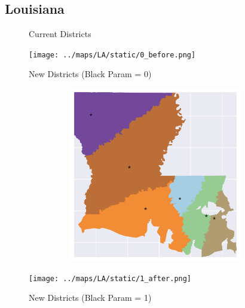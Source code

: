 \subsection{Louisiana}
\begin{figure}[htb!] \centering
\caption{ Current Districts }
\texttt{[image: ../maps/LA/static/0\_before.png]}
\caption{ New Districts (Black Param = 0) }
\includegraphics[width=5in,height=3in,keepaspectratio]{../maps/LA/static/0_after.png}
\caption{ New Districts (Black Param = 1) }
\texttt{[image: ../maps/LA/static/1\_after.png]}
\end{figure}

\clearpage
\newpage

